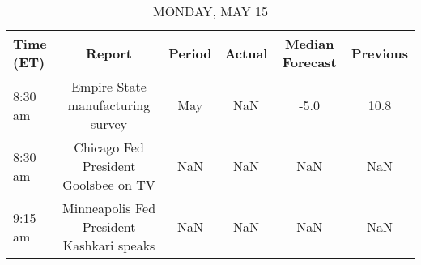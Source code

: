 \documentclass{article}%
\begin{document}
%
\normalsize%


\begin{table}[htbp]%
\caption{MONDAY, MAY 15}%
\centering%
\begin{adjustbox}{width=1\textwidth}%
\begin{tabular}{lccccc}
\toprule
Time (ET) &                                    Report & Period & Actual & Median Forecast & Previous \\
\midrule
  8:30 am &         Empire State manufacturing survey &    May &    NaN &            -5.0 &     10.8 \\
  8:30 am &      Chicago Fed President Goolsbee on TV &    NaN &    NaN &             NaN &      NaN \\
  9:15 am & Minneapolis Fed President Kashkari speaks &    NaN &    NaN &             NaN &      NaN \\
\bottomrule
\end{tabular}
%
\end{adjustbox}%
\end{table}

%
\end{document}

